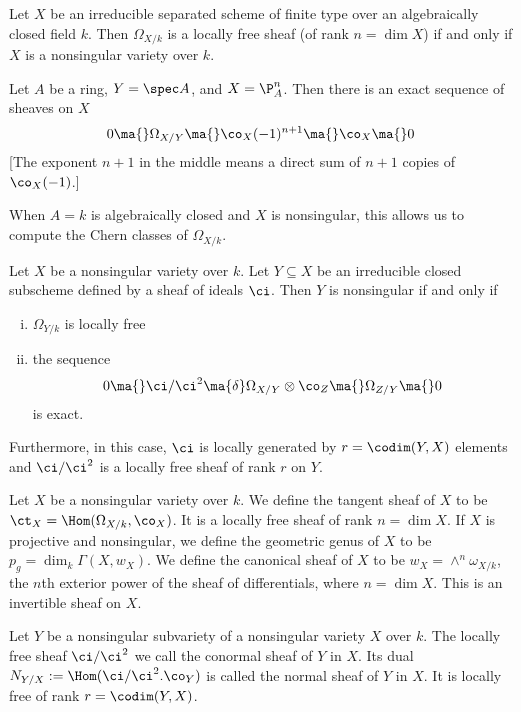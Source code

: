\begin{thmm}
Let $X$ be an irreducible separated scheme of finite type over an algebraically closed field $k$. Then $\Omega_{X/k}$ is a locally free sheaf (of rank $n=\dim X$) if and only if $X$ is a nonsingular variety over $k$.
\end{thmm}


\begin{thmm}
Let $A$ be a ring, $Y=\spec A$, and $X=\P_A^n$. Then there is an exact sequence of sheaves on $X$
	\[
	0 \ma{} \Omega_{X/Y} \ma{} \co_X(-1)^{n+1} \ma{} \co_X \ma{} 0
	\]
[The exponent $n+1$ in the middle means a direct sum of $n+1$ copies of $\co_X(-1)$.]
\end{thmm}

When $A=k$ is algebraically closed and $X$ is nonsingular, this allows us to compute the Chern classes of $\Omega_{X/k}$. 

\begin{thmm}
Let $X$ be a nonsingular variety over $k$. Let $Y \subseteq X$ be an irreducible closed subscheme defined by a sheaf of ideals $\ci$. Then $Y$ is nonsingular if and only if 
\begin{enumerate}[(i)]
\item $\Omega_{Y/k}$ is locally free
\item the sequence 
	\[
	0\ma{} \ci/\ci^2 \ma{\delta} \Omega_{X/Y} \otimes \co_Z \ma{} \Omega_{Z/Y} \ma{} 0
	\]
is exact.
\end{enumerate}
Furthermore, in this case, $\ci$ is locally generated by $r=\codim(Y,X)$ elements and $\ci/\ci^2$ is a locally free sheaf of rank $r$ on $Y$.
\end{thmm}

\begin{dfn}
Let $X$ be a nonsingular variety over $k$. We define the tangent sheaf of $X$ to be $\ct_X=\Hom(\Omega_{X/k}, \co_X)$. It is a locally free sheaf of rank $n=\dim X$. If $X$ is projective and nonsingular, we define the geometric genus of $X$ to be $p_g=\dim_k \Gamma(X,w_X)$. We define the canonical sheaf of $X$ to be $w_X=\wedge^n \omega_{X/k}$, the $n$th exterior power of the sheaf of differentials, where $n=\dim X$. This is an invertible sheaf on $X$.
\end{dfn}


\begin{dfn}
Let $Y$ be a nonsingular subvariety of a nonsingular variety $X$ over $k$. The locally free sheaf $\ci/\ci^2$ we call the conormal sheaf of $Y$ in $X$. Its dual $N_{Y/X}:=\Hom(\ci/\ci^2.\co_Y)$ is called the normal sheaf of $Y$ in $X$. It is locally free of rank $r=\codim(Y,X)$. 
\end{dfn}

